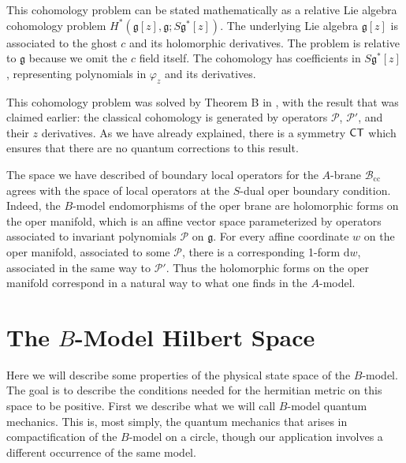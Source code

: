 \documentclass[11pt,a4paper]{article}
\begin{document}
This cohomology problem can be stated mathematically as a relative Lie algebra cohomology problem $H^*(\mathfrak{g}[z],\mathfrak{g};S \mathfrak{g}^*[z])$. 
The underlying Lie algebra $\mathfrak{g}[z]$ is associated to the ghost $c$ and its holomorphic derivatives. The problem is relative to $\mathfrak{g}$ because 
we omit the $c$ field itself. The cohomology has coefficients in $S \mathfrak{g}^*[z]$, representing polynomials in $\varphi_z$ and its derivatives. 

This cohomology problem was solved by Theorem B in \cite{FGT}, with the result that was claimed earlier: the classical cohomology is generated by operators
$\mathcal P$, $\mathcal P'$, and their $z$ derivatives.  As we have already explained, there is a symmetry $\sf {CT}$ which ensures that there are no quantum
corrections to this result.


The  space we have described of boundary local operators for the $A$-brane $\mathcal B_{\mathrm{cc}}$ 
agrees with the space of local operators at the $S$-dual oper boundary condition. 
Indeed, the $B$-model endomorphisms of the oper brane are holomorphic forms on the oper manifold, which is an affine vector space parameterized by
operators associated to invariant polynomials $\mathcal P$ on $\mathfrak g$.  For every affine coordinate $w$ on the oper manifold, associated to some
$\mathcal P$, there is a corresponding 1-form ${\mathrm d} w$, associated in the same way to $\mathcal P'$.   Thus the holomorphic forms on the oper manifold correspond in
a natural way to what one finds in the $A$-model.




\section{The $B$-Model Hilbert Space}\label{bmodel}

Here we will describe some properties of the physical state space of the $B$-model.   The goal is to describe the conditions needed for the hermitian metric on this
space to be positive.  
First we describe what we will call $B$-model quantum mechanics.   This is, most simply, the quantum mechanics that arises in compactification of the $B$-model
on a circle, though our application involves a different occurrence of the same model.
\end{document}
